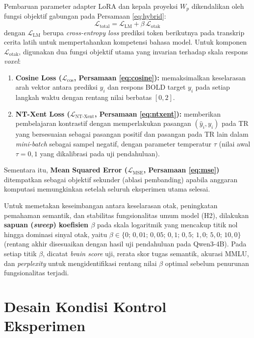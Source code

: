 Pembaruan parameter adapter LoRA dan kepala proyeksi $W_p$ dikendalikan oleh fungsi objektif gabungan pada Persamaan \ref{eq:hybrid}:
\begin{equation*}
  \mathcal{L}_{\text{total}} = \mathcal{L}_{\text{LM}} + \beta\, \mathcal{L}_{\text{otak}}
\end{equation*}
dengan $\mathcal{L}_{\text{LM}}$ berupa \textit{cross-entropy loss} prediksi token berikutnya pada transkrip cerita latih untuk mempertahankan kompetensi bahasa model. Untuk komponen $\mathcal{L}_{\text{otak}}$, digunakan dua fungsi objektif utama yang invarian terhadap skala respons \textit{voxel}:
\begin{enumerate}
  \item \textbf{Cosine Loss ($\mathcal{L}_{\text{cos}}$, Persamaan \ref{eq:cosine}):} memaksimalkan keselarasan arah vektor antara prediksi $\hat{y}_i$ dan respons BOLD target $y_i$ pada setiap langkah waktu dengan rentang nilai berbatas $[0, 2]$.
  \item \textbf{NT-Xent Loss ($\mathcal{L}_{\text{NT-Xent}}$, Persamaan \ref{eq:ntxent}):} memberikan pembelajaran kontrastif dengan memperlakukan pasangan $(\hat{y}_i, y_i)$ pada TR yang bersesuaian sebagai pasangan positif dan pasangan pada TR lain dalam \textit{mini-batch} sebagai sampel negatif, dengan parameter temperatur $\tau$ (nilai awal $\tau = 0{,}1$ yang dikalibrasi pada uji pendahuluan).
\end{enumerate}
Sementara itu, \textbf{Mean Squared Error ($\mathcal{L}_{\text{MSE}}$, Persamaan \ref{eq:mse})} ditempatkan sebagai objektif sekunder (ablasi pembanding) apabila anggaran komputasi memungkinkan setelah seluruh eksperimen utama selesai.

Untuk memetakan keseimbangan antara keselarasan otak, peningkatan pemahaman semantik, dan stabilitas fungsionalitas umum model (H2), dilakukan \textbf{sapuan (\textit{sweep}) koefisien $\beta$} pada skala logaritmik yang mencakup titik nol hingga dominasi sinyal otak, yaitu $\beta \in \{0;\, 0{,}01;\, 0{,}05;\, 0{,}1;\, 0{,}5;\, 1{,}0;\, 5{,}0;\, 10{,}0\}$ (rentang akhir disesuaikan dengan hasil uji pendahuluan pada Qwen3-4B). Pada setiap titik $\beta$, dicatat \textit{brain score} uji, rerata skor tugas semantik, akurasi MMLU, dan \textit{perplexity} untuk mengidentifikasi rentang nilai $\beta$ optimal sebelum penurunan fungsionalitas terjadi.

\section{Desain Kondisi Kontrol Eksperimen}
\label{sec:ds_kontrol}

